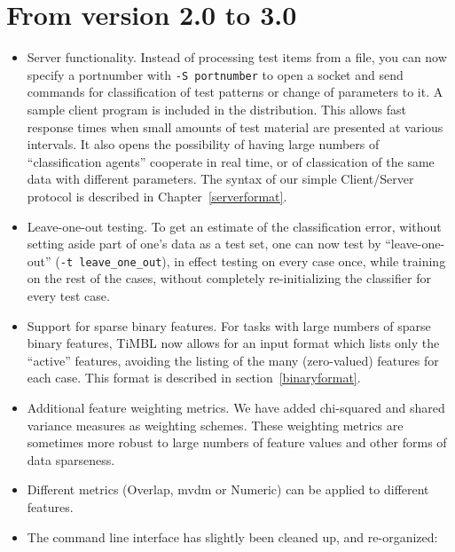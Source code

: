 \documentclass{report}
\begin{document}
\section{From version 2.0 to 3.0}

\begin{itemize}

\item Server functionality. Instead of processing test items from a
file, you can now specify a portnumber with {\tt -S portnumber} to open a
socket and send commands for classification of test patterns or change
of parameters to it. A sample client program is included in the
distribution. This allows fast response times when small amounts of
test material are presented at various intervals. It also opens the
possibility of having large numbers of ``classification agents''
cooperate in real time, or of classication of the same data with
different parameters. The syntax of our simple Client/Server protocol
is described in Chapter~\ref{serverformat}.

\item Leave-one-out testing. To get an estimate of the classification
error, without setting aside part of one's data as a test set, one
can now test by ``leave-one-out'' ({\tt -t leave\_one\_out}), in effect
testing on every case once, while training on the rest of the cases,
without completely re-initializing the classifier for every test case.

\item Support for sparse binary features. For tasks with large numbers
of sparse binary features, TiMBL now allows for an input format which
lists only the ``active'' features, avoiding the listing of the many
(zero-valued) features for each case. This format is described in
section~\ref{binaryformat}.

\item Additional feature weighting metrics. We have added chi-squared
and shared variance measures as weighting schemes. These weighting
metrics are sometimes more robust to large numbers of feature values
and other forms of data sparseness.

\item Different metrics (Overlap, {\sc mvdm} or Numeric) can be
applied to different features.

\item The command line interface has slightly been cleaned up, and
re-organized:

\begin{itemize}


\end{itemize}
\end{itemize}
\end{document}
